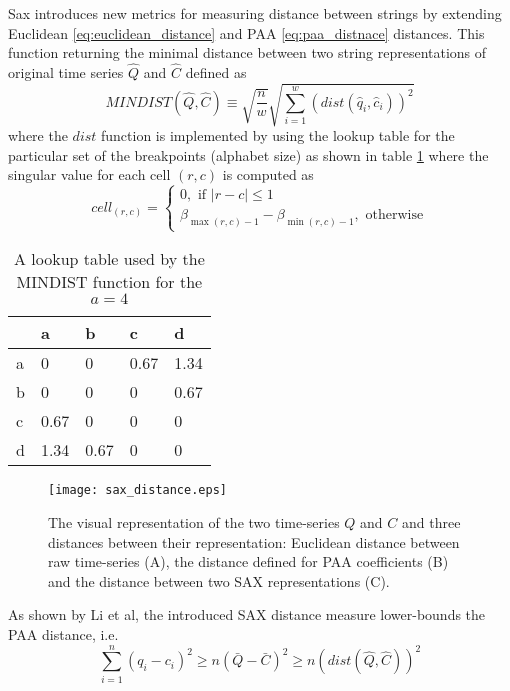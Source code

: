 Sax introduces new metrics for measuring distance between strings by extending Euclidean \ref{eq:euclidean_distance} and PAA \ref{eq:paa_distnace} distances. This function returning the minimal distance between two string representations of original time series $\hat{Q}$ and $\hat{C}$ defined as
\begin{equation}
MINDIST(\hat{Q},\hat{C}) \equiv \sqrt{ \frac{n}{w} } \sqrt{ \sum_{i=1}^{w} ( dist( \hat{q}_{i}, \hat{c}_{i} ) )^{2}}
\label{eq:sax_mindist}
\end{equation} 
where the $dist$ function is implemented by using the lookup table for the particular set of the breakpoints (alphabet size) as shown in table \ref{tbl:sax_lookup} where the singular value for each cell $(r,c)$ is computed as 
\begin{equation}
cell_{(r,c)} = 
\begin{cases} 
0, \text{ if }\left| r-c \right| \leq 1 \\
\beta_{\max(r,c) - 1} - \beta_{\min(r,c) - 1}, \text{ otherwise}
\end{cases}
\label{eq:cell}
\end{equation}
\begin{table}
\begin{tabularx}{400pt}{X X X X X}
\hline
   & a   & b    & c    & d    \\
\hline
a & 0    & 0    & 0.67 & 1.34 \\
b & 0    & 0    & 0    & 0.67 \\
c & 0.67 & 0    & 0    & 0    \\
d & 1.34 & 0.67 & 0    & 0    \\
\hline
\end{tabularx}
\caption{A lookup table used by the MINDIST function for the $a=4$}
\label{tbl:sax_lookup}
\end{table}
\begin{figure}[tbp]
   \centering
   \texttt{[image: sax\_distance.eps]}
   \caption{The visual representation of the two time-series $Q$ and $C$ and three distances between their representation: Euclidean distance between raw time-series (A), the distance defined for PAA coefficients (B) and the distance between two SAX representations (C).}
   \label{fig:sax_distance}
\end{figure}


As shown by Li et al, the introduced SAX distance measure lower-bounds the PAA distance, i.e.
\begin{equation}
\sum_{i=1}^{n} (q_{i} - c_{i})^{2} \geq n(\bar{Q} - \bar{C})^{2} \geq n(dist(\hat{Q},\hat{C}))^2
\label{eq:sax_bounding}
\end{equation}
